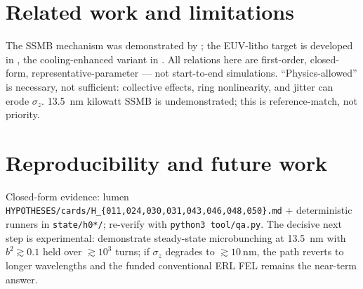 \documentclass[11pt,a4paper]{article}
\begin{document}
\section{Related work and limitations}
The SSMB mechanism was demonstrated by \citet{deng2021}; the EUV-litho target is developed in
\citet{deng2022}, the cooling-enhanced variant in \citet{deng2025}. All relations here are
first-order, closed-form, representative-parameter --- not start-to-end simulations.
``Physics-allowed'' is necessary, not sufficient: collective effects, ring nonlinearity, and jitter
can erode $\sigma_z$. \SI{13.5}{\nano\meter} kilowatt SSMB is undemonstrated; this is reference-match,
not priority.

\section{Reproducibility and future work}
Closed-form evidence: lumen \texttt{HYPOTHESES/cards/H\_\{011,024,030,031,043,046,048,050\}.md} +
deterministic runners in \texttt{state/h0*/}; re-verify with \texttt{python3 tool/qa.py}. The decisive
next step is experimental: demonstrate steady-state microbunching at \SI{13.5}{\nano\meter} with
$b^{2}\gtrsim0.1$ held over $\gtrsim\!10^{3}$ turns; if $\sigma_z$ degrades to
$\gtrsim\!\SI{10}{\nano\meter}$, the path reverts to longer wavelengths and the funded conventional
ERL FEL remains the near-term answer.



\end{document}
